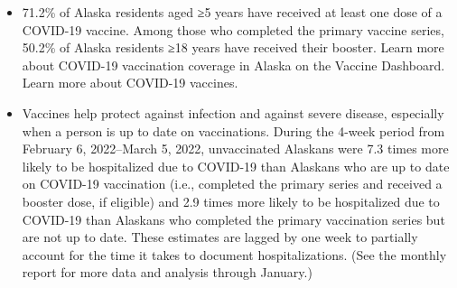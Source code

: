 \documentclass[
]{article}
\begin{document}
\begin{itemize}
\item
  71.2\% of Alaska residents aged ≥5 years have received at least one
  dose of a COVID-19 vaccine. Among those who completed the primary
  vaccine series, 50.2\% of Alaska residents ≥18 years have received
  their booster. Learn more about COVID-19 vaccination coverage in
  Alaska on the Vaccine Dashboard. Learn more about COVID-19 vaccines.
\item
  Vaccines help protect against infection and against severe disease,
  especially when a person is up to date on vaccinations. During the
  4-week period from February 6, 2022--March 5, 2022, unvaccinated
  Alaskans were 7.3 times more likely to be hospitalized due to COVID-19
  than Alaskans who are up to date on COVID-19 vaccination (i.e.,
  completed the primary series and received a booster dose, if eligible)
  and 2.9 times more likely to be hospitalized due to COVID-19 than
  Alaskans who completed the primary vaccination series but are not up
  to date. These estimates are lagged by one week to partially account
  for the time it takes to document hospitalizations. (See the monthly
  report for more data and analysis through January.)
\end{itemize}

~
\end{document}
